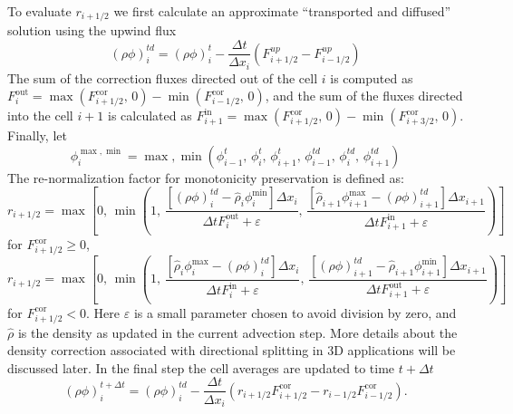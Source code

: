   To evaluate $r_{i+1/2}$ we first calculate an approximate
  ``transported and diffused'' solution using the upwind flux
  \begin{equation}
    (\rho \phi)^{td}_{i} = (\rho \phi)^{t}_{i} - \frac{\Delta t}{\Delta
      x_{i}} \left (F^{up}_{i+1/2} - F^{up}_{i-1/2} \right )
  \end{equation}
  The sum of the correction fluxes directed out of the cell $i$ is
  computed as $F^{\mathrm{out}}_{i} = \max(F^{\mathrm{cor}}_{i+1/2},\, 0) -
  \min(F^{\mathrm{cor}}_{i-1/2},\, 0)$, and the sum of the fluxes
  directed into the cell $i+1$ is calculated as $F^{\mathrm{in}}_{i+1} =
  \max(F^{\mathrm{cor}}_{i+1/2},\, 0) - \min(F^{\mathrm{cor}}_{i+3/2},\,
  0)$. Finally, let
  \begin{equation}
    \phi^{\max,\min}_{i} = \max, \min(\phi^{t}_{i-1}, \, \phi^{t}_{i},
    \, \phi^{t}_{i+1}, \, \phi^{td}_{i-1}, \, \phi^{td}_{i},
    \, \phi^{td}_{i+1})
  \end{equation}
  The re-normalization factor for monotonicity preservation is defined
  as:
  \begin{equation}
    r_{i+1/2} = \max \left [0, \, \min \left(1, \, \frac{[(\rho
          \phi)_{i}^{td} - \hat{\rho}_{i}\phi_{i}^{\min} ]
          \Delta x_{i}}{\Delta t F^{\mathrm{out}}_{i} + \varepsilon}, \,
        \frac{[\hat{\rho}_{i+1} \phi^{\max}_{i+1} - (\rho
          \phi)_{i+1}^{td}] \Delta x_{i+1}}{\Delta t
          F^{\mathrm{in}}_{i+1} + \varepsilon} \right ) \right ]
  \end{equation}
  for $F^{\mathrm{cor}}_{i+1/2} \ge 0$,
  \begin{equation}
    r_{i+1/2} = \max \left [0, \, \min \left(1, \, \frac{[\hat{\rho}_{i}
          \phi^{\max}_{i} - (\rho \phi)_{i}^{td}] \Delta x_{i}}{\Delta t
          F^{\mathrm{in}}_{i} + \varepsilon}, \, \frac{[(\rho
          \phi)_{i+1}^{td} - \hat{\rho}_{i+1}\phi_{i+1}^{\min}
          ] \Delta x_{i+1}}{\Delta t F^{\mathrm{out}}_{i+1} +
          \varepsilon}  \right ) \right ]
  \end{equation}
  for $F^{\mathrm{cor}}_{i+1/2} < 0$. Here $\varepsilon$ is a small
  parameter chosen to avoid division by zero, and $\hat{\rho}$ is the
  density as updated in the current advection step. More details about
  the density correction associated with directional splitting in 3D
  applications will be discussed later. In the final step the cell
  averages are updated to time $t+\Delta t$
  \begin{equation}
    (\rho \phi)^{t+\Delta t}_{i} = (\rho \phi)^{td}_{i} -
    \frac{\Delta t}{\Delta x_{i}} \left
      (r_{i+1/2}F^{\mathrm{cor}}_{i+1/2} -
      r_{i-1/2}F^{\mathrm{cor}}_{i-1/2} \right ).
  \end{equation}

